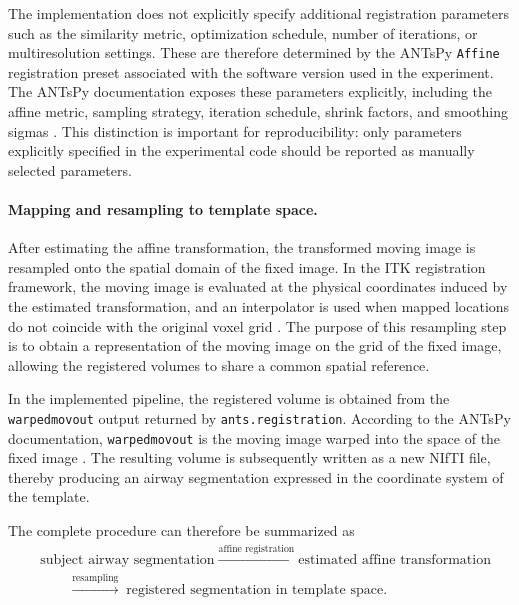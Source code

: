 The implementation does not explicitly specify additional registration
parameters such as the similarity metric, optimization schedule, number of
iterations, or multiresolution settings. These are therefore determined by
the ANTsPy \texttt{Affine} registration preset associated with the software
version used in the experiment. The ANTsPy documentation exposes these
parameters explicitly, including the affine metric, sampling strategy,
iteration schedule, shrink factors, and smoothing sigmas
\cite{antspy_registration}. This distinction is important for reproducibility:
only parameters explicitly specified in the experimental code should be
reported as manually selected parameters.

\paragraph{Mapping and resampling to template space.}  %

After estimating the affine transformation, the transformed moving image is
resampled onto the spatial domain of the fixed image. In the ITK registration
framework, the moving image is evaluated at the physical coordinates induced
by the estimated transformation, and an interpolator is used when mapped
locations do not coincide with the original voxel grid
\cite{itk_software_guide}. The purpose of this resampling step is to obtain a
representation of the moving image on the grid of the fixed image, allowing
the registered volumes to share a common spatial reference.

In the implemented pipeline, the registered volume is obtained from the
\texttt{warpedmovout} output returned by \texttt{ants.registration}. According
to the ANTsPy documentation, \texttt{warpedmovout} is the moving image warped
into the space of the fixed image \cite{antspy_registration}. The resulting
volume is subsequently written as a new NIfTI file, thereby producing an airway
segmentation expressed in the coordinate system of the template.

The complete procedure can therefore be summarized as
\begin{equation}
  \begin{split}
    &\text{subject airway segmentation}
     \;\xrightarrow{\text{affine registration}}\;
     \text{estimated affine transformation} \\
    &\qquad\xrightarrow{\text{resampling}}\;
     \text{registered segmentation in template space}.
  \end{split}
  \label{eq:affine_pipeline}     %
\end{equation}

